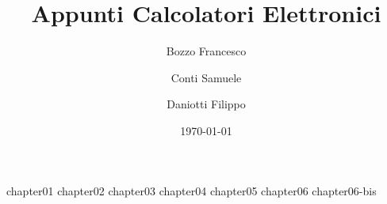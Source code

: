 \documentclass[a4paper,12pt]{book}
\author{Bozzo Francesco \and Conti Samuele \and Daniotti Filippo}
\title{Appunti Calcolatori Elettronici}
\date{\today}
\begin{document}
	\frontmatter
	\maketitle
	\tableofcontents

	\mainmatter

	{chapter01}
	{chapter02}
	{chapter03}
	{chapter04}
	{chapter05}
	{chapter06}
	{chapter06-bis}

	\backmatter
\end{document}
